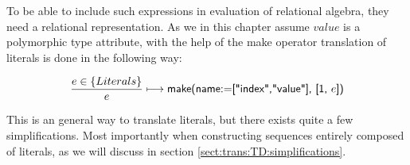 To be able to include such expressions in evaluation of relational algebra, they need a relational representation.
As we in this chapter assume $value$ is a polymorphic type attribute, with the help of the \textsf{make} operator
translation of literals is done in the following way:

\begin{equation}
\frac{e \in \left\{Literals\right\}}{e}\longmapsto
\mbox{\textsf{make(name:=["index","value"], [1, }}e\mbox{\textsf{])}}
\label{rule:trans:TD:literal}
\end{equation}

This is an general way to translate literals, but there exists quite a few simplifications. Most importantly when
constructing sequences entirely composed of literals, as we will discuss in section
\ref{sect:trans:TD:simplifications}.

